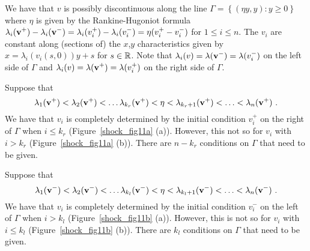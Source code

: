 We have that $v$ is possibly discontinuous along the line
$\displaystyle \Gamma = \left\{ (\eta y,y) : y \geq 0 \right\}$
where $\eta$ is given by the Rankine-Hugoniot formula
$\displaystyle \lambda_i(\mathbf{v}^+) - \lambda_i(\mathbf{v}^-)
= \lambda_i(v_i^+) - \lambda_i(v_i^-) = \eta (v_i^+ - v_i^-)$
for $1 \leq i \leq n$.  The $v_i$ are constant along (sections
of) the $x$,$y$ characteristics given by 
$x = \lambda_i(v_i(s,0)) y + s$ for $s \in \mathbb{R}$.  Note that
$\displaystyle \lambda_i(v) = \lambda(\mathbf{v}^-) = \lambda(v_i^-)$ on
the left side of $\Gamma$ and
$\displaystyle \lambda_i(v) = \lambda(\mathbf{v}^+) = \lambda(v_i^+)$ on
the right side of $\Gamma$.

Suppose that
\begin{equation} \label{systConLawEq4}
\lambda_1(\mathbf{v}^+) < \lambda_2(\mathbf{v}^+) < \ldots
\lambda_{k_r}(\mathbf{v}^+) < \eta < \lambda_{k_r+1}(\mathbf{v}^+)
< \ldots  < \lambda_n(\mathbf{v}^+) \ .
\end{equation}
We have that $v_i$ is completely determined by the initial condition
$\displaystyle v_i^+$ on the right of $\Gamma$ when $i\leq k_r$
(Figure~\ref{shock_fig11a} (a)).  However, this not so for $v_i$ with
$i>k_r$ (Figure~\ref{shock_fig11a} (b)).
There are $n-k_r$ conditions on $\Gamma$ that need to be
given.


Suppose that
\begin{equation} \label{systConLawEq5}
\lambda_1(\mathbf{v}^-) < \lambda_2(\mathbf{v}^-) < \ldots
\lambda_{k_l}(\mathbf{v}^-) < \eta < \lambda_{k_l+1}(\mathbf{v}^-)
< \ldots  < \lambda_n(\mathbf{v}^-) \ .
\end{equation}
We have that $v_i$ is completely determined by the initial condition
$\displaystyle v_i^-$ on the left of $\Gamma$ when $i > k_l$
(Figure~\ref{shock_fig11b} (a)).  However, this is not so for $v_i$ with
$i\leq k_l$ (Figure~\ref{shock_fig11b} (b)).  There are $k_l$
conditions on $\Gamma$ that need to be given.


